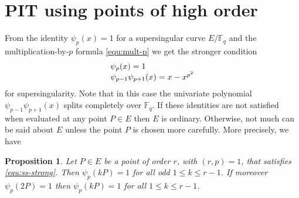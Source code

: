\documentclass[12pt]{article}
\theoremstyle{plain}
\newtheorem{proposition}[theorem]{Proposition}
\theoremstyle{definition}
\def\F{\ensuremath{\mathbb{F}}}
\begin{document}


\section{PIT using points of high order}
\label{sec:pit-h-order}

From the identity $\psi_p(x) = 1$ for a supersingular curve $E/\F_q$ and the multiplication-by-$p$ 
formula \eqref{equ:mult-p} we get the stronger condition
\begin{equation}
\label{equ:ss-strong}
	\arraycolsep=1.4pt
	\begin{array}{l}
		\psi_p(x) = 1 \\
		\psi_{p - 1}\psi_{p + 1}(x) = x - x^{p^2}
	\end{array}
\end{equation}
for supersingularity. Note that in this case the univariate polynomial $\psi_{p - 1}\psi_{p + 
1}(x)$ splits completely over $\F_q$. If these identities are not satisfied when evaluated at any 
point $P \in E$ then $E$ is ordinary. Otherwise, not much can be said about $E$ unless the point 
$P$ is chosen more carefully. More precisely, we have
\begin{proposition}
	Let $P \in E$ be a point of order $r$, with $(r, p) = 1$, that satisfies \eqref{equ:ss-strong}. 
	Then $\psi_p(kP) = 1$ for all odd $1 \le k \le r - 1$. If moreover $\psi_p(2P) = 1$ then 
	$\psi_p(kP) = 1$ for all $1 \le k \le r - 1$.
\end{proposition}
\end{document}
